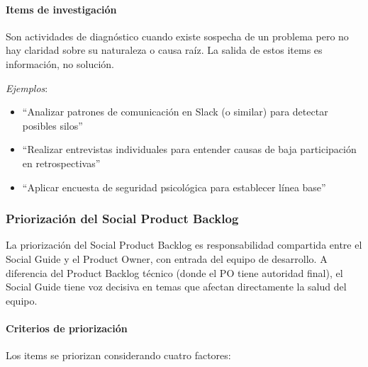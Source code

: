 \paragraph{Items de investigación}

Son actividades de diagnóstico cuando existe sospecha de un problema pero no hay claridad sobre su naturaleza o causa raíz. La salida de estos items es información, no solución.

\textit{Ejemplos}:
\begin{itemize}
    \item ``Analizar patrones de comunicación en Slack (o similar) para detectar posibles silos''
    \item ``Realizar entrevistas individuales para entender causas de baja participación en retrospectivas''
    \item ``Aplicar encuesta de seguridad psicológica para establecer línea base''
\end{itemize}

\subsubsection{Priorización del Social Product Backlog}

La priorización del Social Product Backlog es responsabilidad compartida entre el Social Guide y el Product Owner, con entrada del equipo de desarrollo. A diferencia del Product Backlog técnico (donde el PO tiene autoridad final), el Social Guide tiene voz decisiva en temas que afectan directamente la salud del equipo.

\paragraph{Criterios de priorización}

Los items se priorizan considerando cuatro factores:

